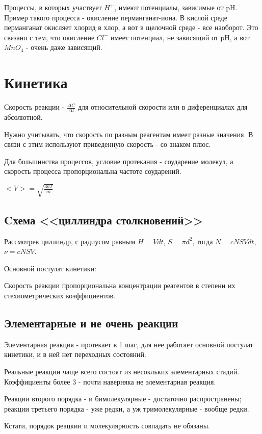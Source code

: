 \documentclass[11pt]{article}
\begin{document}
Процессы, в которых участвует $H^+$, имеют потенциалы, зависимые от pH. Пример такого процесса - окисление перманганат-иона. В кислой среде перманганат окисляет хлорид в хлор, а вот в щелочной среде - все наоборот. Это связано с тем, что окисление $Cl^-$ имеет потенциал, не зависящий от pH, а вот $MnO_4$ - очень даже зависящий. 



\section{Кинетика}

Скорость реакции - $\frac{\Delta C}{\Delta t}$ для относительной скорости или в диференциалах для абсолютной.

Нужно учитывать, что скорость по разным реагентам имеет разные значения. В связи с этим используют приведенную скорость - со знаком плюс.

Для большинства процессов, условие протекания - соударение молекул, а скорость процесса пропорциональна частоте соударений. 

$<V> = \sqrt{\frac{3kT}{m}}$

\subsection{Cхема <<циллиндра столкновений>>}
Рассмотрев циллиндр, с радиусом равным 
$H = Vdt$, $S = \pi d^2$, тогда $N = cNSVdt$, $\nu = cNSV$.

Основной постулат кинетики:

Скорость реакции пропорциональна концентрации реагентов в степени их стехиометрических коэффициентов.


\subsection{Элементарные и не очень реакции}

Элементарная реакция - протекает в 1 шаг, для нее работает основной постулат кинетики, и в ней нет переходных состояний. 

Реальные реакции чаще всего состоят из несокльких элементарных стадий. Коэффициенты более 3 - почти наверняка не элементарная реакция.

Реакции второго порядка - и бимолекулярные - достаточно распространены; реакции третьего порядка - уже редки, а уж тримолекулярные - вообще редки.

Кстати, порядок реацкии и молекулярность совпадать не обязаны.
\end{document}
